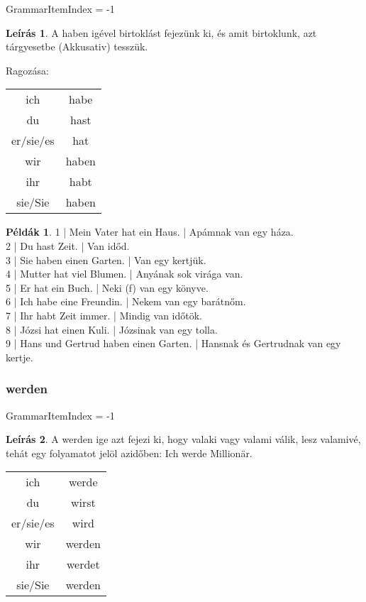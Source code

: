 \documentclass{article}
\theoremstyle{definition}
\newtheorem*{exmp}{Példák}
\newtheorem*{desc}{Leírás}
\begin{document}
GrammarItemIndex = -1

\begin{desc}
A haben igével birtoklást fejezünk ki, és amit birtoklunk, azt tárgyesetbe (Akkusativ) tesszük.

Ragozása:

\begin{tabular}{cc}
ich & habe\\
du & hast\\
er/sie/es & hat\\
wir & haben\\
ihr & habt\\
sie/Sie & haben\\
\end{tabular}
\end{desc}

\begin{exmp}
1 | Mein Vater hat ein Haus. | Apámnak van egy háza.\\
2 | Du hast Zeit. | Van időd.\\
3 | Sie haben einen Garten. | Van egy kertjük.\\
4 | Mutter hat viel Blumen. | Anyának sok virága van.\\
5 | Er hat ein Buch. | Neki (f) van egy könyve.\\
6 | Ich habe eine Freundin. | Nekem van egy barátnőm.\\
7 | Ihr habt Zeit immer. | Mindig van időtök.\\
8 | Józsi hat einen Kuli. | Józsinak van egy tolla.\\
9 | Hans und Gertrud haben einen Garten. | Hansnak és Gertrudnak van egy kertje.\\
\end{exmp}

\subsubsection{werden}

GrammarItemIndex = -1

\begin{desc}
A werden ige azt fejezi ki, hogy valaki vagy valami válik, lesz
valamivé, tehát egy folyamatot jelöl azidőben:
Ich werde Millionär.

\begin{tabular}{cc}
 ich & werde \\
 du & wirst \\
 er/sie/es & wird \\
 wir & werden \\
 ihr & werdet \\
 sie/Sie & werden \\
\end{tabular}
\end{desc}
\end{document}
